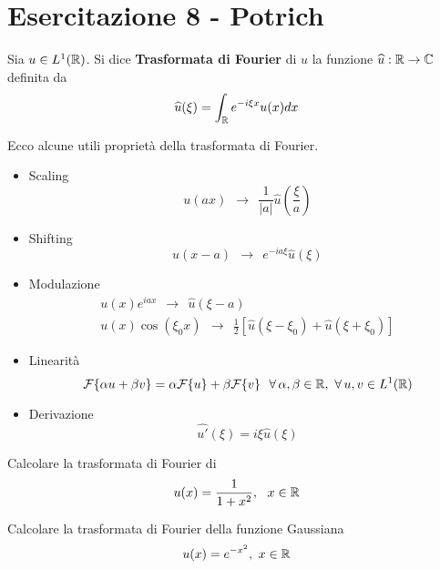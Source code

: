 \chapter{Esercitazione 8 - Potrich}
\ParteEsercizi
\begin{defn}
Sia $u\in L^{1}(\mathbb{R})$. Si dice \textbf{Trasformata di Fourier} di $u$ la funzione $\widehat{u} :\mathbb{R} \rightarrow \mathbb{C} $ definita da
\begin{equation*}
\widehat{u}(\xi) = \int _{\mathbb{R} } e^{ - i\xi x} u(x) dx
\end{equation*}
\end{defn}
\begin{thm}
[Proprietà] Ecco alcune utili proprietà della trasformata di Fourier.
\begin{itemize}
\item Scaling\begin{equation*}
u(ax) \ \ \rightarrow \ \ \frac{1}{| a| }\hat{u}\left(\frac{\xi }{a}\right)
\end{equation*}
\item Shifting\begin{equation*}
u(x - a) \ \ \rightarrow \ \ e^{ - ia\xi }\hat{u}(\xi)
\end{equation*}
\item Modulazione\begin{gather*}
u(x) e^{iax} \ \ \rightarrow \ \ \hat{u}(\xi - a)\\
u(x)\cos(\xi _{0} x) \ \ \rightarrow \ \ \frac{1}{2}[\hat{u}(\xi - \xi _{0}) + \hat{u}(\xi + \xi _{0})]
\end{gather*}
\item Linearità\begin{equation*}
\Fc \{\alpha u + \beta v\} = \alpha \Fc \{u\} + \beta \Fc \{v\} \ \ \forall \alpha ,\beta \in \RR  ,\ \forall u,v\in L^{1}(\RR)
\end{equation*}
\item Derivazione\begin{equation*}
\widehat{u'}(\xi) = i\xi \hat{u}(\xi)
\end{equation*}
\end{itemize}
\end{thm}

Calcolare la trasformata di Fourier di
\begin{equation*}
u(x) = \frac{1}{1 + x^{2}} ,\ \ x\in \mathbb{R} 
\end{equation*}

Calcolare la trasformata di Fourier della funzione Gaussiana
\begin{equation*}
u(x) = e^{ - x^{2}} ,\ x\in \mathbb{R} 
\end{equation*}
\Esercizio{}

